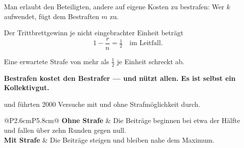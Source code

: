 \begin{merksatz}
Man erlaubt den Beteiligten, andere auf eigene Kosten zu bestrafen: Wer $k$ aufwendet, fügt dem Bestraften $m$ zu.

Der Trittbrettgewinn je nicht eingebrachter Einheit beträgt
\[ 1 - \frac{r}{n} = \tfrac12 \quad\text{im Leitfall.} \]

Eine erwartete Strafe von mehr als $\tfrac12$ je Einheit schreckt ab.

\begin{center}
\begin{minipage}{0.9\textwidth}
\textbf{Bestrafen kostet den Bestrafer --- und nützt allen. Es ist selbst ein Kollektivgut.}
\end{minipage}
\end{center}

\begin{center}
\begin{minipage}{0.88\textwidth}
\end{minipage}
\end{center}

 und  führten 2000 Versuche mit und ohne Strafmöglichkeit durch.

\begin{center}
{\small
\renewcommand{\arraystretch}{1.5}
\begin{tabular}{@{}P{2.6cm}P{5.8cm}@{}}
\toprule
\textbf{Ohne Strafe} & Die Beiträge beginnen bei etwa der Hälfte und fallen über zehn Runden gegen null.\\
\textbf{Mit Strafe} & Die Beiträge steigen und bleiben nahe dem Maximum.\\
\bottomrule
\end{tabular}}
\end{center}

\begin{center}
\begin{minipage}{0.88\textwidth}
\end{minipage}
\end{center}


\end{merksatz}
